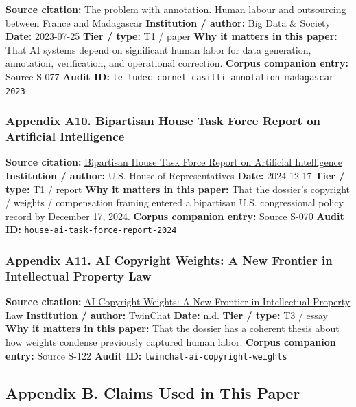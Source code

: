 \documentclass[
  american,
  11pt,
  letterpaper,
]{article}
\begin{document}
\textbf{Source citation:}
\href{https://journals.sagepub.com/doi/10.1177/20539517231188723}{The
problem with annotation. Human labour and outsourcing between France and
Madagascar} \textbf{Institution / author:} Big Data \& Society
\textbf{Date:} 2023-07-25 \textbf{Tier / type:} T1 / paper \textbf{Why
it matters in this paper:} That AI systems depend on significant human
labor for data generation, annotation, verification, and operational
correction. \textbf{Corpus companion entry:} Source S-077 \textbf{Audit
ID:} \texttt{le-ludec-cornet-casilli-annotation-madagascar-2023}

\subsubsection{Appendix A10. Bipartisan House Task Force Report on
Artificial
Intelligence}\label{appendix-a10-bipartisan-house-task-force-report-on-artificial-intelligence}

\textbf{Source citation:}
\href{https://www.speaker.gov/wp-content/uploads/2024/12/AI-Task-Force-Report-FINAL.pdf}{Bipartisan
House Task Force Report on Artificial Intelligence} \textbf{Institution
/ author:} U.S. House of Representatives \textbf{Date:} 2024-12-17
\textbf{Tier / type:} T1 / report \textbf{Why it matters in this paper:}
That the dossier's copyright / weights / compensation framing entered a
bipartisan U.S. congressional policy record by December 17, 2024.
\textbf{Corpus companion entry:} Source S-070 \textbf{Audit ID:}
\texttt{house-ai-task-force-report-2024}

\subsubsection{Appendix A11. AI Copyright Weights: A New Frontier in
Intellectual Property
Law}\label{appendix-a11-ai-copyright-weights-a-new-frontier-in-intellectual-property-law}

\textbf{Source citation:}
\href{https://medium.com/twinchat/ai-copyright-weights-a-new-frontier-in-intellectual-property-law-d8ee1b6c55ee}{AI
Copyright Weights: A New Frontier in Intellectual Property Law}
\textbf{Institution / author:} TwinChat \textbf{Date:} n.d. \textbf{Tier
/ type:} T3 / essay \textbf{Why it matters in this paper:} That the
dossier has a coherent thesis about how weights condense previously
captured human labor. \textbf{Corpus companion entry:} Source S-122
\textbf{Audit ID:} \texttt{twinchat-ai-copyright-weights}

\subsection{Appendix B. Claims Used in This
Paper}\label{appendix-b.-claims-used-in-this-paper}
\end{document}
